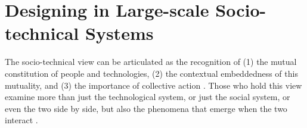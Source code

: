 \section{Designing in Large-scale Socio-technical Systems}
\label{sec:design}

\begin{svgraybox}
The socio-technical view can be articulated as the recognition of (1) the mutual constitution of people and technologies, (2) the contextual embeddedness of this mutuality, and (3) the importance of collective action \cite{Sawyer2014}. 
Those who hold this view examine more than just the technological system, or just the social system, or even the two side by side, but also the phenomena that emerge when the two interact \cite{Lee2001}. 
\end{svgraybox}



